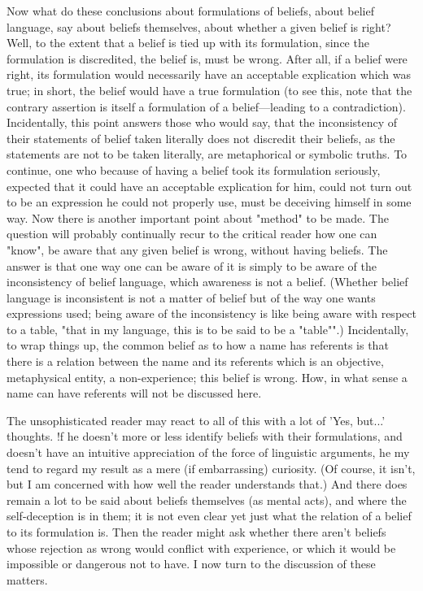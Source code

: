\documentclass[10pt,twoside,draft]{memoir}
\begin{document}
{Now what do these conclusions about formulations of beliefs, about 
belief language, say about beliefs themselves, about whether a given belief is 
right? Well, to the extent that a belief is tied up with its formulation, since 
the formulation is discredited, the belief is, must be wrong. After all, if a 
belief were right, its formulation would necessarily have an acceptable 
explication which was true; in short, the belief would have a true 
formulation (to see this, note that the contrary assertion is itself a 
formulation of a belief---leading to a contradiction). Incidentally, this point 
answers those who would say, that the inconsistency of their statements of 
belief taken literally does not discredit their beliefs, as the statements are not 
to be taken literally, are metaphorical or symbolic truths. To continue, one 
who because of having a belief took its formulation seriously, expected that 
it could have an acceptable explication for him, could not turn out to be an 
expression he could not properly use, must be deceiving himself in some 
way. Now there is another important point about "method" to be made. 
The question will probably continually recur to the critical reader how one 
can "know", be aware that any given belief is wrong, without having beliefs. 
The answer is that one way one can be aware of it is simply to be aware of 
the inconsistency of belief language, which awareness is not a belief. 
(Whether belief language is inconsistent is not a matter of belief but of the 
way one wants expressions used; being aware of the inconsistency is like 
being aware with respect to a table, "that in my language, this is to be said to 
be a "table"".) Incidentally, to wrap things up, the common belief as to how 
a name has referents is that there is a relation between the name and its 
referents which is an objective, metaphysical entity, a non-experience; this 
belief is wrong. How, in what sense a name can have referents will not be 
discussed here. 

The unsophisticated reader may react to all of this with a lot of 'Yes, 
but...' thoughts. !f he doesn't more or less identify beliefs with their 
formulations, and doesn't have an intuitive appreciation of the force of 
linguistic arguments, he my tend to regard my result as a mere (if 
embarrassing) curiosity. (Of course, it isn't, but I am concerned with how 
well the reader understands that.) And there does remain a lot to be said 
about beliefs themselves (as mental acts), and where the self-deception is in 
them; it is not even clear yet just what the relation of a belief to its 
formulation is. Then the reader might ask whether there aren't beliefs whose 
rejection as wrong would conflict with experience, or which it would be 
impossible or dangerous not to have. I now turn to the discussion of these 
matters. 


}
\end{document}
